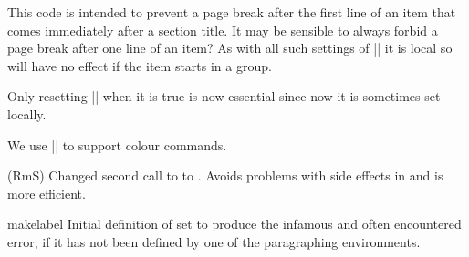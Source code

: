     \begin{teX}
      \box\@labels
      \penalty\z@
    \fi
    \end{teX}
    This code is intended to prevent a page break after the first
    line of an item that comes immediately after a section title. It
    may be sensible to always forbid a page break after one line of
    an item?  As with all such settings of |\clubpenalty| it is local
    so will have no effect if the item starts in a group.

    Only resetting |\@nobreak| when it is true is now
    essential since now it is sometimes set locally.
    \begin{teX}
    \if@nobreak
      \@nobreakfalse
      \clubpenalty \@M
    \else
      \clubpenalty \@clubpenalty
      \everypar{}%
    \fi}%
    \end{teX}
    \begin{teX}
  \if@noitemarg
    \@noitemargfalse
    \if@nmbrlist
    \end{teX}
    \begin{teX}
      \@listctr
    \fi
  \fi
    \end{teX}
    
We use |\sbox| to support colour commands.
\begin{teX}
  \sbox{}%
  \global\setbox\@labels\hbox{%
    \unhbox\@labels
    \hskip \itemindent
    \hskip -\labelwidth 
    \hskip -\labelsep
    \ifdim \wd\@tempboxa >\labelwidth
      \box\@tempboxa
\end{teX}
         {(RmS) Changed second call to  to
           .
          Avoids problems with side effects in  and is
               more efficient.}
    \begin{teX}
    \else
      \hbox to%
    \fi
    \hskip \labelsep}%
  \ignorespaces}
    \end{teX}
 
 \begin{docCommand}{makelabel}{}
 Initial definition of  set to produce the infamous and often encountered error, if it
 has not been defined by one of the paragraphing environments.
 \end{docCommand}
 
